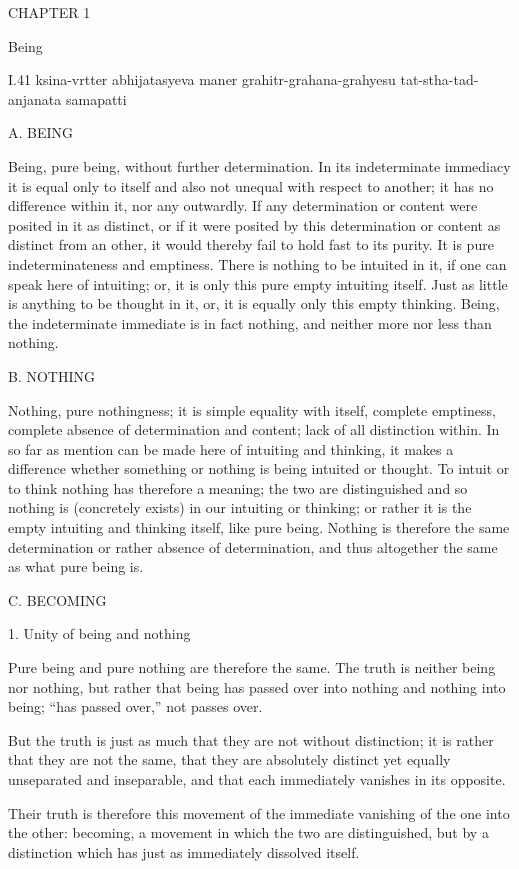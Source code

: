 CHAPTER 1

Being

I.41
ksina-vrtter abhijatasyeva maner
grahitr-grahana-grahyesu tat-stha-tad-anjanata samapatti

A. BEING

Being, pure being, without further determination.
In its indeterminate immediacy it is equal only to itself
and also not unequal with respect to another;
it has no difference within it, nor any outwardly.
If any determination or content were posited in it as distinct,
or if it were posited by this determination or content
as distinct from an other,
it would thereby fail to hold fast to its purity.
It is pure indeterminateness and emptiness.
There is nothing to be intuited in it,
if one can speak here of intuiting;
or, it is only this pure empty intuiting itself.
Just as little is anything to be thought in it,
or, it is equally only this empty thinking.
Being, the indeterminate immediate is in fact nothing,
and neither more nor less than nothing.

B. NOTHING

Nothing, pure nothingness;
it is simple equality with itself,
complete emptiness,
complete absence of determination and content;
lack of all distinction within.
In so far as mention can be made here of
intuiting and thinking,
it makes a difference whether something or nothing is
being intuited or thought.
To intuit or to think nothing has therefore a meaning;
the two are distinguished and so nothing is (concretely exists)
in our intuiting or thinking;
or rather it is the empty intuiting and thinking itself,
like pure being.
Nothing is therefore the same determination
or rather absence of determination,
and thus altogether the same as what pure being is.

C. BECOMING

1. Unity of being and nothing

Pure being and pure nothing are therefore the same.
The truth is neither being nor nothing,
but rather that being has passed over into nothing
and nothing into being;
“has passed over,” not passes over.

But the truth is just as much that
they are not without distinction;
it is rather that they are not the same,
that they are absolutely distinct
yet equally unseparated and inseparable,
and that each immediately vanishes in its opposite.

Their truth is therefore this movement of
the immediate vanishing of the one into the other:
becoming, a movement in which the two are distinguished,
but by a distinction which has just as immediately dissolved itself.

